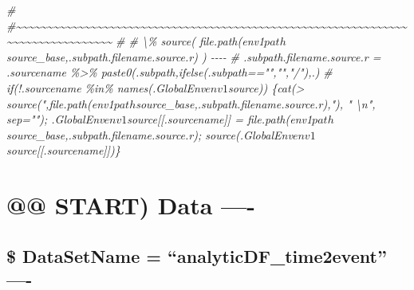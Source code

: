 \documentclass[
]{article}
\newenvironment{Shaded}{\begin{snugshade}}{\end{snugshade}}
\newcommand{\CommentTok}[1]{\textcolor[rgb]{0.56,0.35,0.01}{\textit{#1}}}
\begin{document}
\begin{Shaded}
\begin{Highlighting}[]
\CommentTok{\# \#\textasciitilde{}\textasciitilde{}\textasciitilde{}\textasciitilde{}\textasciitilde{}\textasciitilde{}\textasciitilde{}\textasciitilde{}\textasciitilde{}\textasciitilde{}\textasciitilde{}\textasciitilde{}\textasciitilde{}\textasciitilde{}\textasciitilde{}\textasciitilde{}\textasciitilde{}\textasciitilde{}\textasciitilde{}\textasciitilde{}\textasciitilde{}\textasciitilde{}\textasciitilde{}\textasciitilde{}\textasciitilde{}\textasciitilde{}\textasciitilde{}\textasciitilde{}\textasciitilde{}\textasciitilde{}\textasciitilde{}\textasciitilde{}\textasciitilde{}\textasciitilde{}\textasciitilde{}\textasciitilde{}\textasciitilde{}\textasciitilde{}\textasciitilde{}\textasciitilde{}\textasciitilde{}\textasciitilde{}\textasciitilde{}\textasciitilde{}\textasciitilde{}\textasciitilde{}\textasciitilde{}\textasciitilde{}\textasciitilde{}\textasciitilde{}\textasciitilde{}\textasciitilde{}\textasciitilde{}\textasciitilde{}\textasciitilde{}\textasciitilde{}\textasciitilde{}\textasciitilde{}\textasciitilde{}\textasciitilde{}\textasciitilde{}\textasciitilde{}\textasciitilde{}\textasciitilde{}\textasciitilde{}\textasciitilde{}\textasciitilde{}\textasciitilde{}\textasciitilde{}\textasciitilde{}\textasciitilde{}\textasciitilde{}\textasciitilde{}\textasciitilde{}\textasciitilde{}\textasciitilde{}\textasciitilde{}\textasciitilde{}\textasciitilde{}\textasciitilde{}  }
\CommentTok{\# \# \textbackslash{}\% source( file.path(env1$path$source\_base,.subpath.filename.source.r) ) {-}{-}{-}{-}  }
\CommentTok{\# .subpath.filename.source.r = .sourcename \%\textgreater{}\% paste0(.subpath,ifelse(.subpath=="","","/"),.)}
\CommentTok{\# if(!.sourcename \%in\% names(.GlobalEnv$env1$source)) \{cat(\textquotesingle{}\textgreater{} source("\textquotesingle{},file.path(env1$path$source\_base,.subpath.filename.source.r),\textquotesingle{}")\textquotesingle{}, "  \textbackslash{}n", sep=""); .GlobalEnv$env1$source[[.sourcename]] = file.path(env1$path$source\_base,.subpath.filename.source.r); source(.GlobalEnv$env1$source[[.sourcename]])\}}
\end{Highlighting}
\end{Shaded}

\hypertarget{start-data--}{%
\section{@@ START) Data ----}\label{start-data--}}

\hypertarget{datasetname-analyticdf_time2event--}{%
\subsection{\$ DataSetName = ``analyticDF\_time2event''
----}\label{datasetname-analyticdf_time2event--}}
\end{document}
